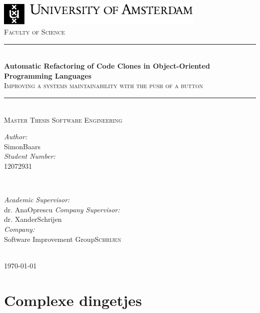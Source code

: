 \documentclass{article}
\title{\thesistitle}
\author{\thesisauthorfirst\space\thesisauthorsecond}
\date{\thesisdate}
\def\thesistitle{Automatic Refactoring of Code Clones in Object-Oriented Programming Languages}
\def\thesissubtitle{Improving a systems maintainability with the push of a button}
\def\thesisauthorfirst{Simon}
\def\thesisauthorsecond{Baars}
\def\thesissupervisorfirst{dr. Ana}
\def\thesissupervisorsecond{Oprescu}
\def\thesissecondreaderfirst{dr. Xander}
\def\thesissecondreadersecond{Schrijen}
\def\thesisdate{\today}
\theoremstyle{definition}
\theoremstyle{remark}
\begin{document}
\begin{titlepage}
	\thispagestyle{empty}
	\newcommand{\HRule}{\rule{\linewidth}{0.5mm}}
	\center
	\includegraphics[width=100mm]{img/logoUvA_en.pdf}\\[.5cm]
	\textsc{Faculty of Science}\\[0.5cm]
	
	\HRule \\[0.4cm]
	{ \huge \bfseries \thesistitle}\\[0.1cm]
	\textsc{\thesissubtitle}\\
	\HRule \\[.5cm]
	\textsc{\large Master Thesis Software Engineering}\\[.5cm]
	
	\begin{minipage}{0.4\textwidth}
	\begin{flushleft} \large
	\emph{Author:}\\
	\thesisauthorfirst\space \thesisauthorsecond \\[1em]
	\emph{Student Number:}\\
	12072931 \\[1em]
	\end{flushleft}
	\end{minipage}
	~
	\begin{minipage}{0.4\textwidth}
	\begin{flushright} \large
	\emph{Academic Supervisor:} \\
	\thesissupervisorfirst\space \thesissupervisorsecond 
	\emph{Company Supervisor:} \\
	\thesissecondreaderfirst\space \thesissecondreadersecond \\[1em]
	\emph{Company:} \\
	Software Improvement Group\space \textsc{\thesissecondreadersecond}
	\end{flushright}
	\end{minipage}\\[4cm]
	\vfill
	{\large \thesisdate}\\
	\clearpage
\end{titlepage}

\tableofcontents

\newpage
\section{Complexe dingetjes}
\end{document}
